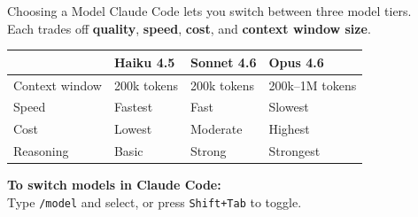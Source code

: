 \documentclass[aspectratio=169, 11pt]{beamer}
\begin{document}
\begin{frame}{Choosing a Model}
  Claude Code lets you switch between three model tiers.\\
  Each trades off \textbf{quality}, \textbf{speed}, \textbf{cost}, and \textbf{context window size}.

  \vspace{0.5em}
  \begin{center}
  \small
  \begin{tabular}{@{}llll@{}}
    \toprule
    & \textbf{Haiku 4.5} & \textbf{Sonnet 4.6} & \textbf{Opus 4.6} \\
    \midrule
    Context window & 200k tokens & 200k tokens & 200k--1M tokens \\
    Speed          & Fastest     & Fast        & Slowest \\
    Cost           & Lowest      & Moderate    & Highest \\
    Reasoning      & Basic       & Strong      & Strongest \\
    \bottomrule
  \end{tabular}
  \end{center}

  \vspace{0.3em}
  \textbf{To switch models in Claude Code:}\\
  Type \texttt{/model} and select, or press \texttt{Shift+Tab} to toggle.
\end{frame}
\end{document}
